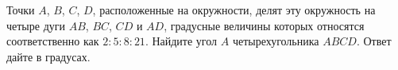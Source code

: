 \begin{ex}
	\begin{condition}
		Точки \( A \), \( B \), \( C \), \( D \), расположенные на окружности, делят эту окружность на четыре дуги \( AB \), \( BC \), \( CD  \) и \( AD \), градусные величины которых относятся соответственно как \( 2:5:8:21 \). Найдите угол \( A  \) четырехугольника \( ABCD \). Ответ дайте в градусах.
	\end{condition}
\end{ex}